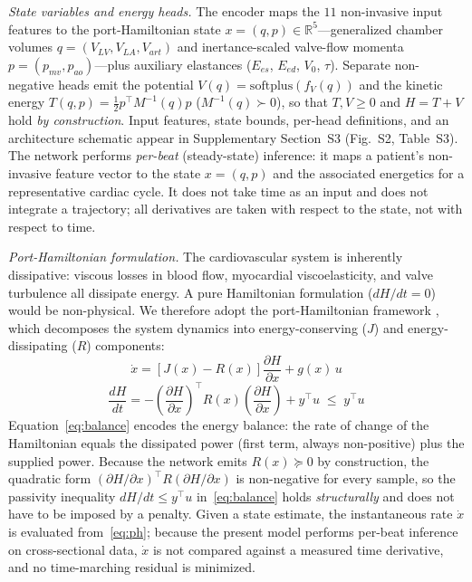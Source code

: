 \documentclass[journal]{IEEEtran}
\begin{document}
\emph{State variables and energy heads.} The encoder maps the $11$ non-invasive input features to the port-Hamiltonian state $x=(q,p)\in\mathbb{R}^{5}$---generalized chamber volumes $q=(V_{LV},V_{LA},V_{art})$ and inertance-scaled valve-flow momenta $p=(p_{mv},p_{ao})$---plus auxiliary elastances ($E_{es}$, $E_{ed}$, $V_0$, $\tau$). Separate non-negative heads emit the potential $V(q)=\mathrm{softplus}(f_V(q))$ and the kinetic energy $T(q,p)=\tfrac{1}{2}p^{\top}M^{-1}(q)p$ ($M^{-1}(q)\succ0$), so that $T,V\ge0$ and $H=T+V$ hold \emph{by construction}. Input features, state bounds, per-head definitions, and an architecture schematic appear in Supplementary Section~S3 (Fig.~S2, Table~S3). The network performs \emph{per-beat} (steady-state) inference: it maps a patient's non-invasive feature vector to the state $x=(q,p)$ and the associated energetics for a representative cardiac cycle. It does not take time as an input and does not integrate a trajectory; all derivatives are taken with respect to the state, not with respect to time.

\emph{Port-Hamiltonian formulation.} The cardiovascular system is inherently dissipative: viscous losses in blood flow, myocardial viscoelasticity, and valve turbulence all dissipate energy. A pure Hamiltonian formulation ($dH/dt=0$) would be non-physical. We therefore adopt the port-Hamiltonian framework \cite{vanderschaft2014}, which decomposes the system dynamics into energy-conserving ($J$) and energy-dissipating ($R$) components:
\begin{equation}\label{eq:ph}
\dot{x} = \left[J(x) - R(x)\right]\frac{\partial H}{\partial x} + g(x)\,u
\end{equation}
\begin{equation}\label{eq:balance}
\frac{dH}{dt} = -\left(\frac{\partial H}{\partial x}\right)^{\!\top}\! R(x)\left(\frac{\partial H}{\partial x}\right) + y^{\top}u \;\le\; y^{\top}u
\end{equation}
Equation~\eqref{eq:balance} encodes the energy balance: the rate of change of the Hamiltonian equals the dissipated power (first term, always non-positive) plus the supplied power. Because the network emits $R(x)\succeq0$ by construction, the quadratic form $(\partial H/\partial x)^{\top}R(\partial H/\partial x)$ is non-negative for every sample, so the passivity inequality $dH/dt\le y^{\top}u$ in~\eqref{eq:balance} holds \emph{structurally} and does not have to be imposed by a penalty. Given a state estimate, the instantaneous rate $\dot{x}$ is evaluated from~\eqref{eq:ph}; because the present model performs per-beat inference on cross-sectional data, $\dot{x}$ is not compared against a measured time derivative, and no time-marching residual is minimized.
\end{document}
